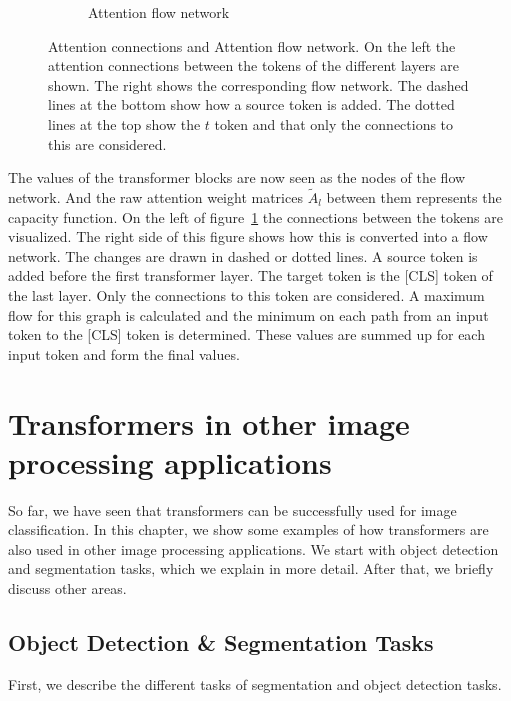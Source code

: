 \documentclass[a4paper]{scrartcl}
\let\stdsection\section
\renewcommand\section{\newpage\stdsection}
\begin{document}
\begin{figure}[btp]
\begin{subfigure}[t]{0.4\textwidth}
            \caption{Attention flow network}
        \end{subfigure}
        \caption[Attention connections and Attention Flow network]{
            Attention connections and Attention flow network.
            On the left the attention connections between the tokens of the different layers are shown.
            The right shows the corresponding flow network.
            The dashed lines at the bottom show how a source token is added.
            The dotted lines at the top show the $t$ token and that only the connections to this are considered.
        }
        \label{fig:attention-flow-network}
    \end{figure}

    The values of the transformer blocks are now seen as the nodes of the flow network.
    And the raw attention weight matrices $\tilde{A}_l$ between them represents the capacity function.
    On the left of figure~\ref{fig:attention-flow-network} the connections between the tokens are visualized.
    The right side of this figure shows how this is converted into a flow network.
    The changes are drawn in dashed or dotted lines.
    A source token is added before the first transformer layer.
    The target token is the [CLS] token of the last layer.
    Only the connections to this token are considered.
    A maximum flow for this graph is calculated and the minimum on each path from an input token to the [CLS] token is determined.
    These values are summed up for each input token and form the final values.



    \section{Transformers in other image processing applications}\label{sec:transformers-in-other-image-processing-applications}
    So far, we have seen that transformers can be successfully used for image classification.
    In this chapter, we show some examples of how transformers are also used in other image processing applications.
    We start with object detection and segmentation tasks, which we explain in more detail.
    After that, we briefly discuss other areas.

    \subsection{Object Detection \& Segmentation Tasks}\label{subsec:object-detection}
    First, we describe the different tasks of segmentation and object detection tasks.
\end{document}
